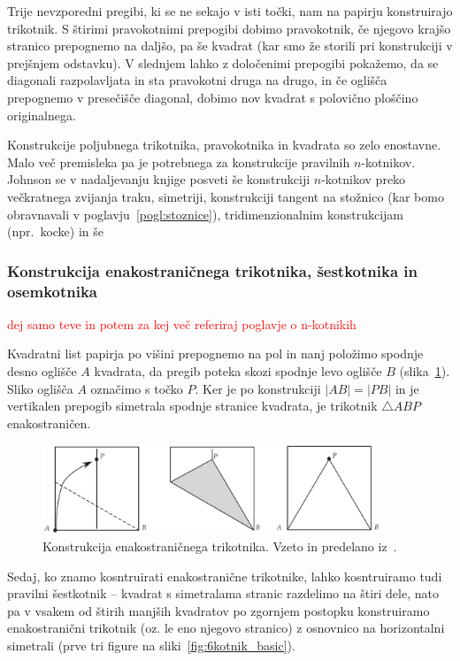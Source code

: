 Trije nevzporedni pregibi, ki se ne sekajo v isti točki, nam na papirju konstruirajo trikotnik. S štirimi pravokotnimi prepogibi dobimo pravokotnik, če njegovo krajšo stranico prepognemo na daljšo, pa še kvadrat (kar smo že storili pri konstrukciji v prejšnjem odstavku). V slednjem lahko z določenimi prepogibi pokažemo, da se diagonali razpolavljata in sta pravokotni druga na drugo, in če oglišča prepognemo v presečišče diagonal, dobimo nov kvadrat s polovično ploščino originalnega.

Konstrukcije poljubnega trikotnika, pravokotnika in kvadrata so zelo enostavne. Malo več premisleka pa je potrebnega za konstrukcije pravilnih $n$-kotnikov. Johnson se v nadaljevanju knjige posveti še konstrukciji $n$-kotnikov preko večkratnega zvijanja traku, simetriji, konstrukciji tangent na stožnico (kar bomo obravnavali v poglavju~\ref{pogl:stoznice}), tridimenzionalnim konstrukcijam (npr.\ kocke) in še

\subsubsection*{Konstrukcija enakostraničnega trikotnika, šestkotnika in osemkotnika}

\textcolor{red}{dej samo teve in potem za kej več referiraj poglavje o n-kotnikih}

Kvadratni list papirja po višini prepognemo na pol in nanj položimo spodnje desno oglišče $A$ kvadrata, da pregib poteka skozi spodnje levo oglišče $B$ (slika~\ref{fig:trik_enak_basic}). Sliko oglišča $A$ označimo s točko $P$. Ker je po konstrukciji $|AB| = |PB|$ in je vertikalen prepogib simetrala spodnje stranice kvadrata, je trikotnik $\triangle ABP$ enakostraničen.

\begin{figure}[h]
    \centering
    \includegraphics[width=0.9\textwidth]{images/n-kotniki/trik_enak_basic.png}
    \caption[Konstrukcija enakostraničnega trikotnika (način $1$)]{Konstrukcija enakostraničnega trikotnika. Vzeto in predelano iz~\cite[str. 9]{hull2013}.}
    \label{fig:trik_enak_basic}
\end{figure}

Sedaj, ko znamo kosntruirati enakostranične trikotnike, lahko kosntruiramo tudi pravilni šestkotnik -- kvadrat s simetralama stranic razdelimo na štiri dele, nato pa v vsakem od štirih manjših kvadratov po zgornjem postopku konstruiramo enakostranični trikotnik (oz. le eno njegovo stranico) z osnovnico na horizontalni simetrali (prve tri figure na sliki~\ref{fig:6kotnik_basic}).

